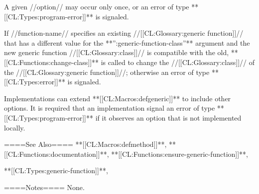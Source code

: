 A given //option// may occur only once, or an error of type **[[CL:Types:program-error]]** is signaled.

 If //function-name// specifies an existing //[[CL:Glossary:generic function]]// that has a different value for the **'':generic-function-class''** argument and the new generic function //[[CL:Glossary:class]]// is compatible with the old, **[[CL:Functions:change-class]]** is called to change the //[[CL:Glossary:class]]// of the //[[CL:Glossary:generic function]]//; otherwise an error of type **[[CL:Types:error]]** is signaled.

Implementations can extend **[[CL:Macros:defgeneric]]** to include other options. It is required that an implementation signal an error of type **[[CL:Types:program-error]]** if it observes an option that is not implemented locally.

====See Also====
**[[CL:Macros:defmethod]]**, **[[CL:Functions:documentation]]**, **[[CL:Functions:ensure-generic-function]]**,

**[[CL:Types:generic-function]]**,{\secref\GFMethodLambdaListCongruency}

====Notes====
None.

     
